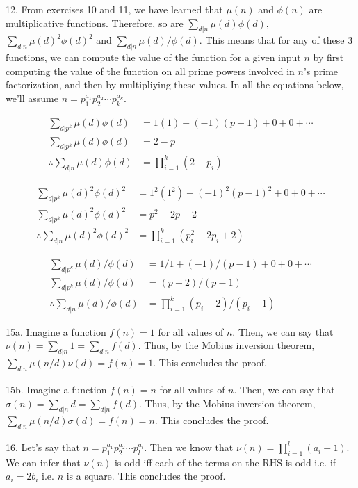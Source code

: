 \documentclass{article}
\begin{document}
12. From exercises 10 and 11, we have learned that $\mu(n)$ and $\phi(n)$ are multiplicative functions. Therefore, so are $\sum_{d | n} \mu(d) \phi(d)$, $\sum_{d | n} \mu(d)^2 \phi(d)^2$ and $\sum_{d | n} \mu(d) / \phi(d)$. This means that for any of these 3 functions, we can compute the value of the function for a given input $n$ by first computing the value of the function on all prime powers involved in $n$'s prime factorization, and then by multipliying these values. In all the equations below, we'll assume $n = p_1^{a_1} p_2^{a_2} \cdots p_k^{a_k}$.

\begin{align*}
    \sum_{d | p^k} \mu(d) \phi(d) &=  1(1) + (-1)(p - 1) + 0 + 0 + \cdots \\
    \sum_{d | p^k} \mu(d) \phi(d) &=  2 - p \\
    \therefore \sum_{d | n} \mu(d) \phi(d) &= \prod_{i = 1}^k (2 - p_i)
\end{align*}

\begin{align*}
    \sum_{d | p^k} \mu(d)^2 \phi(d)^2 &=  1^2(1^2) + (-1)^2(p - 1)^2 + 0 + 0 + \cdots \\
    \sum_{d | p^k} \mu(d)^2 \phi(d)^2 &=  p^2 - 2p + 2 \\
    \therefore \sum_{d | n} \mu(d)^2 \phi(d)^2 &= \prod_{i = 1}^k (p_i^2 -2p_i + 2)
\end{align*}

\begin{align*}
    \sum_{d | p^k} \mu(d) / \phi(d) &=  1 / 1 + (-1) / (p - 1) + 0 + 0 + \cdots \\
    \sum_{d | p^k} \mu(d) / \phi(d) &=  (p - 2) / (p - 1) \\
    \therefore \sum_{d | n} \mu(d) / \phi(d) &= \prod_{i = 1}^k (p_i - 2) / (p_i - 1)
\end{align*}

15a. Imagine a function $f(n) = 1$ for all values of $n$. Then, we can say that $\nu(n) = \sum_{d | n} 1 = \sum_{d | n} f(d)$. Thus, by the Mobius inversion theorem, $\sum_{d | n} \mu(n/d)\nu(d) = f(n) = 1$. This concludes the proof. 

15b. Imagine a function $f(n) = n$ for all values of $n$. Then, we can say that $\sigma(n) = \sum_{d | n} d = \sum_{d | n} f(d)$. Thus, by the Mobius inversion theorem, $\sum_{d | n} \mu(n/d)\sigma(d) = f(n) = n$. This concludes the proof.

16. Let's say that $n = p_1^{a_1} p_2^{a_2} \cdots p_l^{a_l}$. Then we know that $\nu(n) = \prod_{i = 1}^l (a_i + 1)$. We can infer that $\nu(n)$ is odd iff each of the terms on the RHS is odd i.e. if $a_i = 2b_i$ i.e. $n$ is a square. This concludes the proof.
\end{document}
